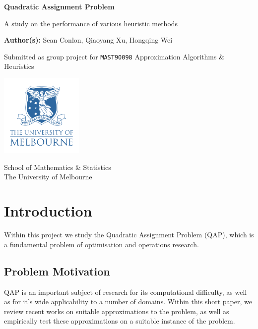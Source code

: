 \documentclass[a4paper,10pt]{article}
\begin{document}
\begin{titlepage}
   \begin{center}
       \vspace*{1cm}

       \textbf{Quadratic Assignment Problem}

       \vspace{0.5cm}
        A study on the performance of various heuristic methods
            
       \vspace{1.5cm}

        
       \textbf{Author(s):} Sean Conlon, Qiaoyang Xu, Hongqing Wei  \\

       \vfill
            
       Submitted as group project for \texttt{MAST90098} Approximation Algorithms \& Heuristics
            
       \vspace{0.8cm}
     
       \includegraphics[width=0.3\textwidth]{images/uomlogo.png}
            
       School of Mathematics \& Statistics \\
       The University of Melbourne\\
            
   \end{center}
\end{titlepage}

\tableofcontents
\thispagestyle{empty}
\clearpage
\setcounter{page}{1}



\newpage
\section{Introduction}
Within this project we study the Quadratic Assignment Problem (QAP), which is a fundamental problem of  optimisation and operations research. 

\subsection{Problem Motivation}
QAP is an important subject of research for its computational difficulty, as well as for it's wide applicability to a number of domains. Within this short paper, we review recent works on suitable approximations to the problem, as well as empirically test these approximations on a suitable instance of the problem.
\end{document}
